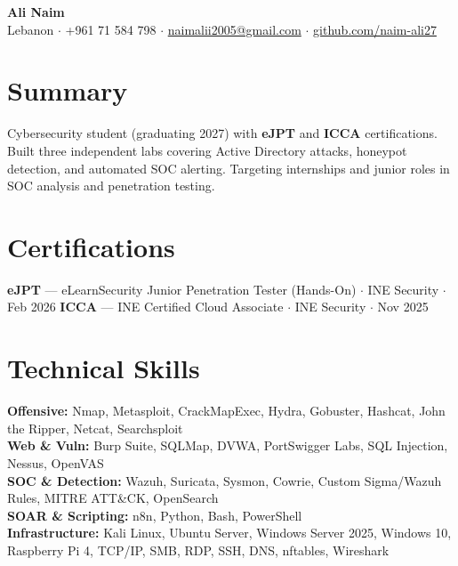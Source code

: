 \documentclass[10pt]{article}
\begin{document}
\raggedright

\begin{center}
  {\LARGE\bfseries Ali Naim}\\[3pt]
  {\small
  Lebanon
  $\cdot$ \textcolor{resumeteal}{+961 71 584 798}
  $\cdot$ \href{mailto:naimalii2005@gmail.com}{naimalii2005@gmail.com}
  $\cdot$ \href{https://github.com/naim-ali27}{github.com/naim-ali27}
  }
\end{center}

\vspace{1pt}

\section{Summary}

Cybersecurity student (graduating 2027) with \textbf{eJPT} and \textbf{ICCA} certifications. Built three
independent labs covering Active Directory attacks, honeypot detection, and automated SOC alerting.
Targeting internships and junior roles in SOC analysis and penetration testing.

\section{Certifications}

\textbf{eJPT} --- eLearnSecurity Junior Penetration Tester (Hands-On) $\cdot$ INE Security $\cdot$ Feb 2026\quad
\textbf{ICCA} --- INE Certified Cloud Associate $\cdot$ INE Security $\cdot$ Nov 2025

\section{Technical Skills}

\vspace{1pt}
\textbf{Offensive:} Nmap, Metasploit, CrackMapExec, Hydra, Gobuster, Hashcat, John the Ripper, Netcat, Searchsploit\\[2pt]
\textbf{Web \& Vuln:} Burp Suite, SQLMap, DVWA, PortSwigger Labs, SQL Injection, Nessus, OpenVAS\\[2pt]
\textbf{SOC \& Detection:} Wazuh, Suricata, Sysmon, Cowrie, Custom Sigma/Wazuh Rules, MITRE ATT\&CK, OpenSearch\\[2pt]
\textbf{SOAR \& Scripting:} n8n, Python, Bash, PowerShell\\[2pt]
\textbf{Infrastructure:} Kali Linux, Ubuntu Server, Windows Server 2025, Windows 10, Raspberry Pi 4, TCP/IP, SMB, RDP, SSH, DNS, nftables, Wireshark
\end{document}
